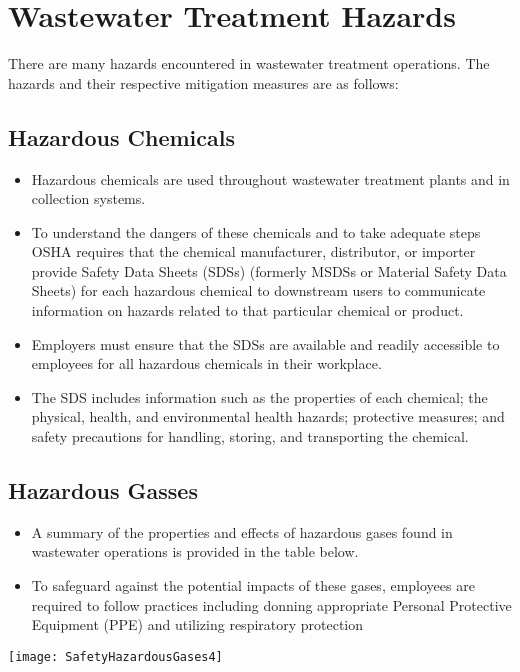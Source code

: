 \documentclass{article}
\begin{document}
\newpage

\section{Wastewater Treatment Hazards}
There are many hazards encountered in wastewater treatment operations.  The hazards and their respective mitigation measures are as follows:\\
\subsection{Hazardous Chemicals}
\begin{itemize}
\item Hazardous chemicals are used throughout wastewater treatment plants and in collection systems. 
\item To understand the dangers of these chemicals and to take adequate steps OSHA requires that the chemical manufacturer, distributor, or importer provide Safety Data Sheets (SDSs) (formerly MSDSs or Material Safety Data Sheets) for each hazardous chemical to downstream users to communicate information on hazards related to that particular chemical or product.
\item Employers must ensure that the SDSs are available and readily accessible to employees for all hazardous chemicals in their workplace.
\item The SDS includes information such as the properties of each chemical; the physical, health, and environmental health hazards; protective measures; and safety precautions for handling, storing, and transporting the chemical.\\
\end{itemize}
\subsection{Hazardous Gasses}
\begin{itemize}
\item A summary of the properties and effects of hazardous gases found in wastewater operations is provided in the table below.
\item To safeguard against the potential impacts of these gases, employees are required to follow practices including donning appropriate Personal Protective Equipment (PPE) and utilizing respiratory protection\\
\end{itemize}
\begin{center}
\texttt{[image: SafetyHazardousGases4]}\\ 
\end{center}
\end{document}
